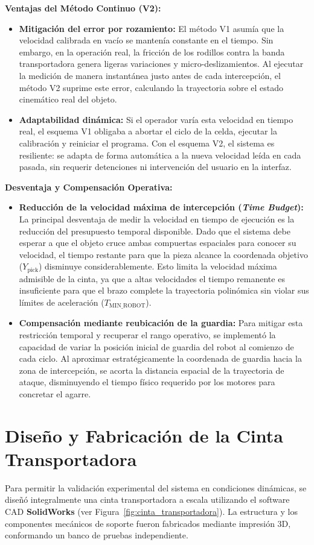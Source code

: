 \documentclass[12pt, a4paper]{report}
\begin{document}
\textbf{Ventajas del Método Continuo (V2):}
\begin{itemize}
    \item \textbf{Mitigación del error por rozamiento:} El método V1 asumía que la velocidad calibrada en vacío se mantenía constante en el tiempo. Sin embargo, en la operación real, la fricción de los rodillos contra la banda transportadora genera ligeras variaciones y micro-deslizamientos. Al ejecutar la medición de manera instantánea justo antes de cada intercepción, el método V2 suprime este error, calculando la trayectoria sobre el estado cinemático real del objeto.
    \item \textbf{Adaptabilidad dinámica:} Si el operador varía esta velocidad en tiempo real, el esquema V1 obligaba a abortar el ciclo de la celda, ejecutar la calibración y reiniciar el programa. Con el esquema V2, el sistema es resiliente: se adapta de forma automática a la nueva velocidad leída en cada pasada, sin requerir detenciones ni intervención del usuario en la interfaz.
\end{itemize}

\textbf{Desventaja y Compensación Operativa:}
\begin{itemize}
    \item \textbf{Reducción de la velocidad máxima de intercepción (\textit{Time Budget}):} La principal desventaja de medir la velocidad en tiempo de ejecución es la reducción del presupuesto temporal disponible. Dado que el sistema debe esperar a que el objeto cruce ambas compuertas espaciales para conocer su velocidad, el tiempo restante para que la pieza alcance la coordenada objetivo ($Y_{\text{pick}}$) disminuye considerablemente. Esto limita la velocidad máxima admisible de la cinta, ya que a altas velocidades el tiempo remanente es insuficiente para que el brazo complete la trayectoria polinómica sin violar sus límites de aceleración ($T_{\text{MIN\_ROBOT}}$).
    \item \textbf{Compensación mediante reubicación de la guardia:} Para mitigar esta restricción temporal y recuperar el rango operativo, se implementó la capacidad de variar la posición inicial de guardia del robot al comienzo de cada ciclo. Al aproximar estratégicamente la coordenada de guardia hacia la zona de intercepción, se acorta la distancia espacial de la trayectoria de ataque, disminuyendo el tiempo físico requerido por los motores para concretar el agarre.
\end{itemize}

\section{Diseño y Fabricación de la Cinta Transportadora}
Para permitir la validación experimental del sistema en condiciones dinámicas, se diseñó integralmente una cinta transportadora a escala utilizando el software CAD \textbf{SolidWorks} (ver Figura~\ref{fig:cinta_transportadora}). La estructura y los componentes mecánicos de soporte fueron fabricados mediante impresión 3D, conformando un banco de pruebas independiente.
\end{document}
